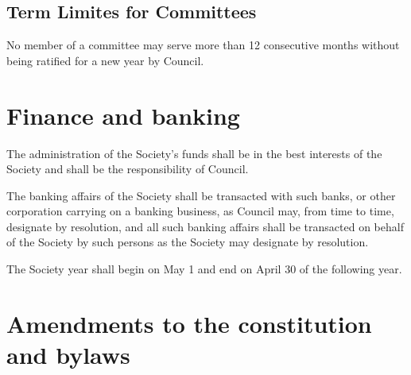 \subsection{Term Limites for Committees}
	\begin{longenum}[label*=\thesubsection.\arabic*., align=left]
	\item No member of a committee may serve more than 12 consecutive months without being ratified for a new year by Council.
\end{longenum}
\newpage

\section{Finance and banking}

	\begin{longenum}[label*=\thesection.\arabic*., align=left]
	\item The administration of the Society's funds shall be in the best interests of the Society and shall be the responsibility of Council.
    \item The banking affairs of the Society shall be transacted with such banks, or other corporation carrying on a banking business, as Council may, from time to time, designate by resolution, and all such banking affairs shall be transacted on behalf of the Society by such persons as the Society may designate by resolution. 
    \item The Society year shall begin on May 1 and end on April 30 of the following year. 
\end{longenum}
\renewcommand*{\theenumi}{\thesubsection.\arabic{enumi}}

\newpage

\section {Amendments to the constitution and bylaws}

